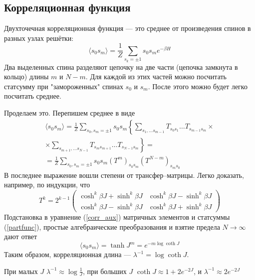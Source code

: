\documentclass{article}
\begin{document}
		\subsection{Корреляционная функция}
		Двухточечная корреляционная функция --- это среднее от произведения спинов в разных 
		узлах решётки:
		\begin{equation}
			\langle s_0 s_m \rangle =	
				\frac{1}{Z}\sum_{s_k = \pm 1} s_0 s_m e^{-\beta H}
		\end{equation}
		Два выделенных спина разделяют цепочку на две части (цепочка замкнута
		в кольцо) длины $m$ и $N - m$. Для каждой из этих частей можно посчитать статсумму при
		"замороженных" спинах $s_0$ и $s_m$. После этого можно будет легко посчитать среднее.
		
		Проделаем это. Перепишем среднее в виде
		\begin{multline}
			\label{corr_aux}
			\langle s_0 s_m \rangle = \frac{1}{Z} \sum_{s_0, s_m = \pm 1}
				s_0 s_m \left \{\sum_{s_1,\dots s_{m-1}} 
						T_{s_0 s_1} \dots T_{s_{m-1}s_m} \times \right.\\
				\left. \times\sum_{s_{m+1}, \dots s_{N-1}} 
						T_{s_m s_{m+1}} \dots T_{s_{N-1}s_m} \right\} = \\
					= \frac{1}{Z} \sum_{s_0, s_m = \pm 1}
				s_0 s_m (T^m)_{s_0 s_m} (T^{N-m})_{s_m s_0}
		\end{multline}
		В последнее выражение вошли степени от трансфер--матрицы. Легко доказать, например,
		по индукции, что
		\begin{equation}
			T^k = 2^{k-1}
			\left(
			\begin{matrix}
				\cosh^k{\beta J} + \sinh^k{\beta J} & \cosh^k{\beta J} - \sinh^k{\beta J} \\
				\cosh^k{\beta J} - \sinh^k{\beta J} & \cosh^k{\beta J} + \sinh^k{\beta J} 
			\end{matrix}
			\right)
		\end{equation}
		Подстановка в уравнение (\ref{corr_aux}) матричных элементов и статсуммы 
		(\ref{partfunc}),
		простые алгебраические преобразования и взятие предела $N \to \infty$ дают ответ
		\begin{equation}
			\langle s_0 s_m \rangle = \tanh J^m = e^{-m\log \coth J}
		\end{equation}
		Таким образом, корреляционная длина --- $\lambda^{-1} = \log \coth J$.

		При малых $J$ $\lambda^{-1} \approx \log\frac{1}{J}$, при больших $J$ 
		$\coth{J} \approx 1 + 2e^{-2J}$, и $\lambda^{-1} \approx 2e^{-2J}$
\end{document}
